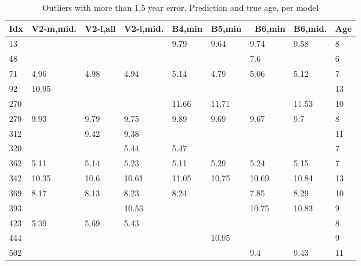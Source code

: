 \documentclass[10pt,letterpaper]{article}
\begin{document}
\begin{table}[!ht]
    \centering
    \caption{Outliers with more than 1.5 year error. Prediction and true age, per model}
    \begin{tabular}{|l|l|l|l|l|l|l|l|l|}
    \hline
        Idx & V2-m,mid. & V2-l,all & V2-l,mid. & B4,min & B5,min &  B6,min & B6,mid. & Age  \\ \hline
        13 & ~ & ~ & ~ & 9.79 & 9.64 & 9.74 & 9.58 & 8  \\ \hline
        48 & ~ & ~ & ~ & ~ & ~ & 7.6 & ~ & 6  \\ \hline
        71 & 4.96 & 4.98 & 4.94 & 5.14 & 4.79 & 5.06 & 5.12 & 7  \\ \hline
        92 & 10.95 & ~ & ~ & ~ & ~ & ~ & ~ & 13  \\ \hline
        270 & ~ & ~ & ~ & 11.66 & 11.71 & ~ & 11.53 & 10  \\ \hline
        279 & 9.93 & 9.79 & 9.75 & 9.89 & 9.69 & 9.67 & 9.7 & 8  \\ \hline
        312 & ~ & 9.42 & 9.38 & ~ & ~ & ~ & ~ & 11  \\ \hline
        320 & ~ & ~ & 5.44 & 5.47 & ~ & ~ & ~ & 7  \\ \hline
        362 & 5.11 & 5.14 & 5.23 & 5.11 & 5.29 & 5.24 & 5.15 & 7  \\ \hline
        342 & 10.35 & 10.6 & 10.61 & 11.05 & 10.75 & 10.69 & 10.84 & 13  \\ \hline
        369 & 8.17 & 8.13 & 8.23 & 8.24 & ~ & 7.85 & 8.29 & 10  \\ \hline
        393 & ~ & ~ & 10.53 & ~ & ~ & 10.75 & 10.83 & 9  \\ \hline
        423 & 5.39 & 5.69 & 5.43 & ~ & ~ & ~ & ~ & 8  \\ \hline
        444 & ~ & ~ & ~ & ~ & 10.95 & ~ & ~ & 9  \\ \hline
        502 & ~ & ~ & ~ & ~ & ~ & 9.4 & 9.43 & 11  \\ \hline
    \end{tabular}
\end{table}
\end{document}
